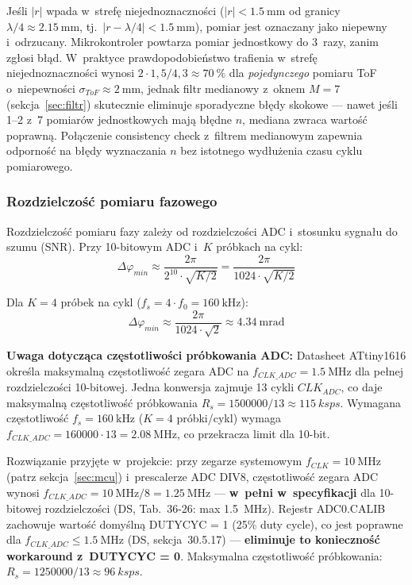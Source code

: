 \documentclass[a4paper,11pt]{article}
\begin{document}
	Jeśli $|r|$ wpada w~strefę niejednoznaczności ($|r| < \SI{1,5}{\milli\metre}$
	od granicy $\lambda/4 \approx \SI{2,15}{\milli\metre}$, tj.\
	$|r - \lambda/4| < \SI{1,5}{\milli\metre}$), pomiar jest oznaczany jako
	niepewny i~odrzucany. Mikrokontroler powtarza pomiar jednostkowy do 3~razy,
	zanim zgłosi błąd. W~praktyce prawdopodobieństwo trafienia w~strefę
	niejednoznaczności wynosi $2 \cdot 1{,}5 / 4{,}3 \approx \SI{70}{\percent}$
	dla \textit{pojedynczego} pomiaru ToF o~niepewności $\sigma_{ToF} \approx
	\SI{2}{\milli\metre}$, jednak filtr medianowy z~oknem $M = 7$
	(sekcja~\ref{sec:filtr}) skutecznie eliminuje sporadyczne błędy skokowe ---
	nawet jeśli 1--2 z~7 pomiarów jednostkowych mają błędne $n$, mediana
	zwraca wartość poprawną. Połączenie consistency check z~filtrem medianowym
	zapewnia odporność na błędy wyznaczania $n$ bez istotnego wydłużenia
	czasu cyklu pomiarowego.
	
	\subsubsection{Rozdzielczość pomiaru fazowego}
	
	Rozdzielczość pomiaru fazy zależy od rozdzielczości ADC i~stosunku sygnału
	do szumu (SNR). Przy 10-bitowym ADC i~$K$ próbkach na cykl:
	\begin{equation}
		\Delta\varphi_{min} \approx \frac{2\pi}{2^{10} \cdot \sqrt{K/2}} = \frac{2\pi}{1024 \cdot \sqrt{K/2}}
		\label{eq:phase_res}
	\end{equation}
	
	Dla $K = 4$ próbek na cykl ($f_s = 4 \cdot f_0 = \SI{160}{\kilo\hertz}$):
	\begin{equation}
		\Delta\varphi_{min} \approx \frac{2\pi}{1024 \cdot \sqrt{2}} \approx \SI{4,34}{\milli\radian}
	\end{equation}
	
	\textbf{Uwaga dotycząca częstotliwości próbkowania ADC:}
	Datasheet ATtiny1616 określa maksymalną częstotliwość zegara ADC na
	$f_{CLK\_ADC} = \SI{1,5}{\mega\hertz}$ dla pełnej rozdzielczości 10-bitowej.
	Jedna konwersja zajmuje 13 cykli $CLK_{ADC}$, co daje maksymalną częstotliwość
	próbkowania $R_s = 1500000/13 \approx \SI{115}{ksps}$. Wymagana częstotliwość
	$f_s = \SI{160}{\kilo\hertz}$ ($K = 4$ próbki/cykl) wymaga
	$f_{CLK\_ADC} = 160000 \cdot 13 = \SI{2,08}{\mega\hertz}$,
	co przekracza limit dla 10-bit.
	
	Rozwiązanie przyjęte w~projekcie: przy zegarze systemowym $f_{CLK} = \SI{10}{\mega\hertz}$
	(patrz sekcja~\ref{sec:mcu}) i~prescalerze ADC DIV8, częstotliwość zegara ADC wynosi
	$f_{CLK\_ADC} = \SI{10}{\mega\hertz}/8 = \SI{1,25}{\mega\hertz}$ ---
	\textbf{w~pełni w~specyfikacji} dla 10-bitowej rozdzielczości
	(DS, Tab.~36-26: max \SI{1,5}{\mega\hertz}).
	Rejestr ADC0.CALIB zachowuje wartość domyślną DUTYCYC = 1 (25\% duty cycle),
	co jest poprawne dla $f_{CLK\_ADC} \leq \SI{1,5}{\mega\hertz}$
	(DS, sekcja~30.5.17) --- \textbf{eliminuje to konieczność workaround z~DUTYCYC = 0}.
	Maksymalna częstotliwość próbkowania: $R_s = 1250000/13 \approx \SI{96}{ksps}$.
	
\end{document}
